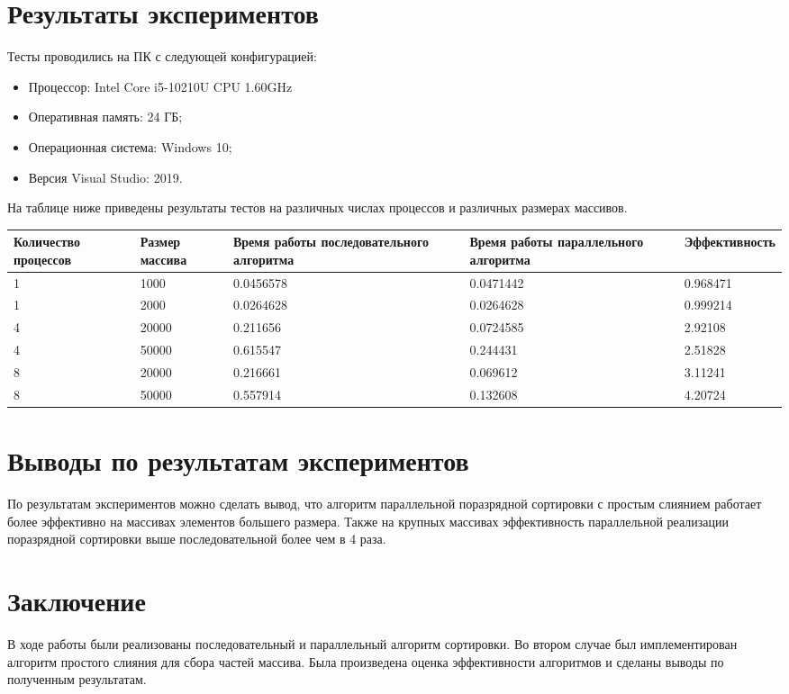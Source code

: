 \documentclass{report}
\begin{document}
\section*{Результаты экспериментов}
Тесты проводились на ПК с следующей конфигурацией:
\begin{itemize}
\item Процессор: Intel Core i5-10210U CPU 1.60GHz
\item Оперативная память: 24 ГБ;
\item Операционная система: Windows 10;
\item Версия Visual Studio: 2019.
\end{itemize}
На таблице ниже приведены результаты тестов на различных числах процессов и различных размерах массивов.
\begin{table}[!h]
\begin{tabular}{| p{2cm} | p{2cm} | p{3cm} | p{3cm} | p{3cm} |}
\hline
Количество процессов & Размер массива & Время работы последовательного алгоритма & Время работы параллельного алгоритма & Эффективность  \\[5pt]
\hline
1 &   1000    & 0.0456578        & 0.0471442     & 0.968471       \\
1  & 2000     & 0.0264628        & 0.0264628     & 0.999214       \\
4    & 20000    & 0.211656        & 0.0724585     & 2.92108       \\
4   &  50000   & 0.615547        & 0.244431     & 2.51828      \\
8    & 20000   & 0.216661        & 0.069612     & 3.11241       \\
8   &  50000   & 0.557914        & 0.132608     & 4.20724       \\
\hline
\end{tabular}
\end{table}
\newpage
\section*{Выводы по результатам экспериментов}
По результатам экспериментов можно сделать вывод, что алгоритм параллельной поразрядной сортировки с простым слиянием работает более эффективно на массивах элементов большего размера. Также на крупных массивах эффективность параллельной реализации поразрядной сортировки выше последовательной более чем в 4 раза.
\newpage
\section*{Заключение}
В ходе работы были реализованы последовательный и параллельный алгоритм сортировки. Во втором случае был имплементирован алгоритм простого слияния для сбора частей массива.
Была произведена оценка эффективности алгоритмов и сделаны выводы по полученным результатам.
\newpage
\end{document}
